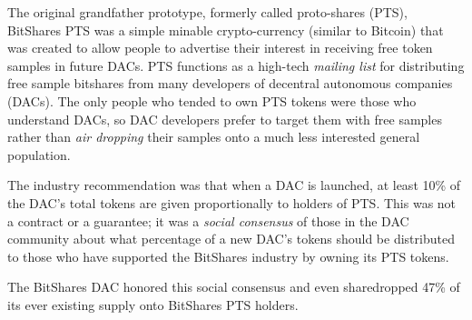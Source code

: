 The original grandfather prototype, formerly called proto-shares (PTS),
BitShares PTS was a simple minable crypto-currency (similar to Bitcoin) that
was created to allow people to advertise their interest in receiving free token
samples in future DACs. PTS functions as a high-tech \emph{mailing list} for
distributing free sample bitshares from many developers of decentral autonomous
companies (DACs). The only people who tended to own PTS tokens were those who
understand DACs, so DAC developers prefer to target them with free samples
rather than \emph{air dropping} their samples onto a much less interested
general population.

The industry recommendation was that when a DAC is launched, at least 10\% of
the DAC's total tokens are given proportionally to holders of PTS. This was not
a contract or a guarantee; it was a \emph{social consensus} of those in the DAC
community about what percentage of a new DAC's tokens should be distributed to
those who have supported the BitShares industry by owning its PTS tokens.

The BitShares DAC honored this social consensus and even sharedropped 47\% of
its ever existing supply onto BitShares PTS holders.
